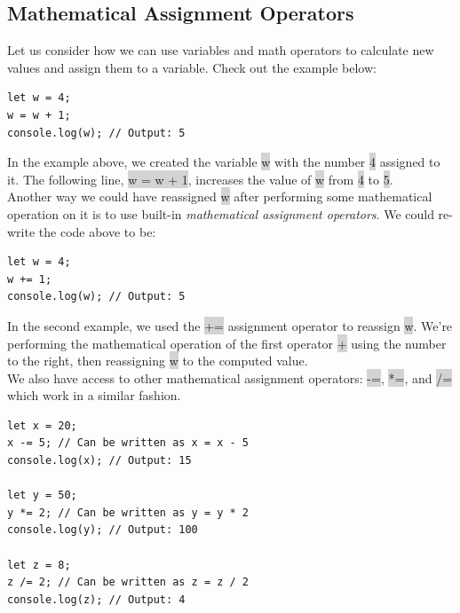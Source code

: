 \documentclass[11pt]{article}
\begin{document}
\subsection{Mathematical Assignment Operators}
Let us consider how we can use variables and math operators to calculate new values and assign them to a variable. Check out the example below:
\begin{lstlisting}
let w = 4;
w = w + 1;
console.log(w); // Output: 5
\end{lstlisting}
In the example above, we created the variable \colorbox{lightgray}{w} with the number \colorbox{lightgray}{4} assigned to it. The following line, \colorbox{lightgray}{w = w + 1}, increases the value of \colorbox{lightgray}{w} from \colorbox{lightgray}{4} to \colorbox{lightgray}{5}. \\
\newline
Another way we could have reassigned \colorbox{lightgray}{w} after performing some mathematical operation on it is to use built-in \textit{mathematical assignment operators}. We could re-write the code above to be:
\begin{lstlisting}
let w = 4;
w += 1;
console.log(w); // Output: 5
\end{lstlisting}
In the second example, we used the \colorbox{lightgray}{+=} assignment operator to reassign \colorbox{lightgray}{w}. We’re performing the mathematical operation of the first operator \colorbox{lightgray}{+} using the number to the right, then reassigning \colorbox{lightgray}{w} to the computed value. \\
\newline
We also have access to other mathematical assignment operators: \colorbox{lightgray}{-=}, \colorbox{lightgray}{*=}, and \colorbox{lightgray}{/=} which work in a similar fashion. 
\begin{lstlisting}
let x = 20;
x -= 5; // Can be written as x = x - 5
console.log(x); // Output: 15

let y = 50;
y *= 2; // Can be written as y = y * 2
console.log(y); // Output: 100

let z = 8;
z /= 2; // Can be written as z = z / 2
console.log(z); // Output: 4 
\end{lstlisting}
\end{document}

